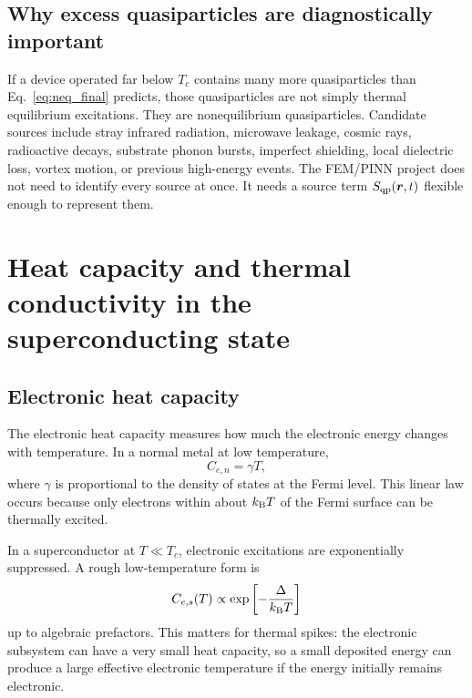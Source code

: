 \documentclass[11pt]{article}
\newcommand{\br}{{\bm{r}}}
\begin{document}
\subsection{Why excess quasiparticles are diagnostically important}
If a device operated far below $T_c$ contains many more quasiparticles than Eq.~\eqref{eq:neq_final} predicts, those quasiparticles are not simply thermal equilibrium excitations. They are nonequilibrium quasiparticles. Candidate sources include stray infrared radiation, microwave leakage, cosmic rays, radioactive decays, substrate phonon bursts, imperfect shielding, local dielectric loss, vortex motion, or previous high-energy events. The FEM/PINN project does not need to identify every source at once. It needs a source term $S_{\qp}(\br,t)$ flexible enough to represent them.

\section{Heat capacity and thermal conductivity in the superconducting state}

\subsection{Electronic heat capacity}
The electronic heat capacity measures how much the electronic energy changes with temperature. In a normal metal at low temperature,
\begin{equation}
 C_{e,n}=\gamma T,
\end{equation}
where $\gamma$ is proportional to the density of states at the Fermi level. This linear law occurs because only electrons within about $k_{\mathrm{B}} T$ of the Fermi surface can be thermally excited.

In a superconductor at $T\ll T_c$, electronic excitations are exponentially suppressed. A rough low-temperature form is
\begin{equation}
 C_{e,s}(T)\propto \exp\left[-\frac{\Delta}{k_{\mathrm{B}} T}\right]
\end{equation}
up to algebraic prefactors. This matters for thermal spikes: the electronic subsystem can have a very small heat capacity, so a small deposited energy can produce a large effective electronic temperature if the energy initially remains electronic.
\end{document}
